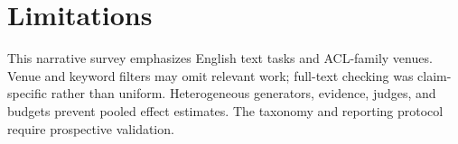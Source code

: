 \documentclass[11pt]{article}
\begin{document}
\section*{Limitations}
This narrative survey emphasizes English text tasks and ACL-family venues. Venue and keyword filters may omit relevant work; full-text checking was claim-specific rather than uniform. Heterogeneous generators, evidence, judges, and budgets prevent pooled effect estimates. The taxonomy and reporting protocol require prospective validation.
\label{sec:mainend}
\clearpage

\clearpage
\appendix

\end{document}

